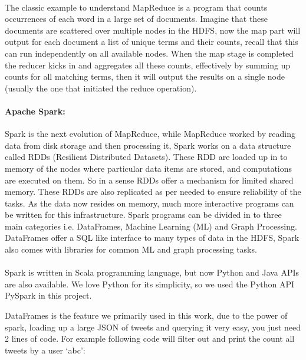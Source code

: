 \documentclass[12pt]{report}
\begin{document}
\paragraph{}The classic example to understand MapReduce is a program that counts occurrences of each word in a large set of documents. Imagine that these documents are scattered over multiple nodes in the HDFS, now the map part will output for each document a list of unique terms and their counts, recall that this can run independently on all available nodes. When the map stage is completed the reducer kicks in and aggregates all these counts, effectively by summing up counts for all matching terms, then it will output the results on a single node (usually the one that initiated the reduce operation).

\paragraph{Apache Spark:\\}
Spark is the next evolution of MapReduce, while MapReduce worked by reading data from disk storage and then processing it, Spark works on a data structure called RDDs (Resilient Distributed Datasets). These RDD are loaded up in to memory of the nodes where particular data items are stored, and computations are executed on them. So in a sense RDDs offer a mechanism for limited shared memory. These RDDs are also replicated as per needed to ensure reliability of the tasks. As the data now resides on memory, much more interactive programs can be written for this infrastructure. Spark programs can be divided in to three main categories i.e. DataFrames, Machine Learning (ML) and Graph Processing. DataFrames offer a SQL like interface to many types of data in the HDFS, Spark also comes with libraries for common ML and graph processing tasks.

\paragraph{}
Spark is written in Scala programming language, but now Python and Java APIs are also available. We love Python for its simplicity, so we used the Python API PySpark in this project.

DataFrames is the feature we primarily used in this work, due to the power of spark, loading up a large JSON of tweets and querying it very easy, you just need 2 lines of code. For example following code will filter out and print the count all tweets by a user `abc':
\end{document}
